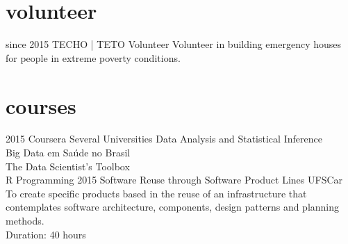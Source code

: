 \documentclass[]{friggeri-cv}
\begin{document}
\section{volunteer}

\begin{entrylist}
  \entry
    {since 2015}
    {TECHO | TETO}
    {Volunteer}
    {Volunteer in building emergency houses for people in extreme poverty conditions.}
\end{entrylist}

\section{courses}

\begin{entrylist}
  \entry
    {2015}
    {Coursera}
    {Several Universities}
    {Data Analysis and Statistical Inference \\
    Big Data em Saúde no Brasil \\
    The Data Scientist's Toolbox \\
    R Programming}
  \entry
    {2015}
    {Software Reuse through Software Product Lines}
    {UFSCar}
    {To create specific products based in the reuse of an infrastructure that contemplates software architecture, components, design patterns and planning methods. \\
    Duration: 40 hours}
\end{entrylist}
\end{document}
